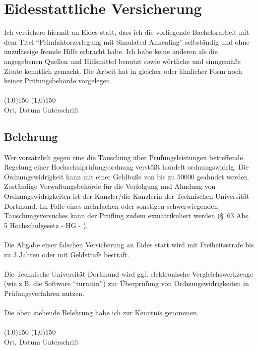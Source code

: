 \printbibliography
\newpage

  \thispagestyle{empty}
  \section*{Eidesstattliche Versicherung}
  \noindent
  Ich versichere hiermit an Eides statt, dass ich die vorliegende Bachelorarbeit mit dem Titel \enquote{Primfaktorzerlegung mit Simulated Annealing} selbständig und ohne unzulässige fremde Hilfe erbracht habe.
  Ich habe keine anderen als die angegebenen Quellen und Hilfsmittel benutzt sowie wörtliche und sinngemäße Zitate kenntlich gemacht.
  Die Arbeit hat in gleicher oder ähnlicher Form noch keiner Prüfungsbehörde vorgelegen.
  \vspace*{1cm}
  \ \\
  \ \\
  \line(1,0){150} \hfill \line(1,0){150} \\
  Ort, Datum \hfill Unterschrift \hspace*{3cm}
  \vspace*{1.5cm}

  \subsection*{Belehrung}
  Wer vorsätzlich gegen eine die Täuschung über Prüfungsleistungen betreffende Regelung einer Hochschulprüfungsordnung verstößt handelt ordnungswidrig.
  Die Ordnungswidrigkeit kann mit einer Geldbuße von bis zu \SI[round-mode=places, round-precision=2, locale=DE]{50000}{\officialeuro} geahndet werden.
  Zuständige Verwaltungsbehörde für die Verfolgung und Ahndung von Ordnungswidrigkeiten ist der Kanzler/die Kanzlerin der Technischen Universität Dortmund.
  Im Falle eines mehrfachen oder sonstigen schwerwiegenden Täuschungsversuches kann der Prüfling zudem exmatrikuliert werden (\S\ 63 Abs. 5 Hochschulgesetz - HG - ). \\
  \ \\
  Die Abgabe einer falschen Versicherung an Eides statt wird mit Freiheitsstrafe bis zu 3 Jahren oder mit Geldstrafe bestraft. \\
  \ \\
  Die Technische Universität Dortmund wird ggf. elektronische Vergleichswerkzeuge (wie z.B. die Software \enquote{turnitin}) zur Überprüfung von Ordnungswidrigkeiten in Prüfungsverfahren nutzen. \\
  \ \\
  Die oben stehende Belehrung habe ich zur Kenntnis genommen.
  \vspace*{1cm}
  \ \\
  \ \\
  \line(1,0){150} \hfill \line(1,0){150} \\
  Ort, Datum \hfill Unterschrift \hspace*{3cm}%
